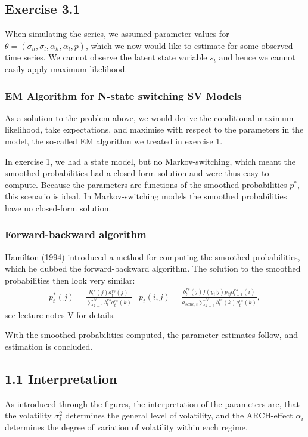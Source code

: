\documentclass[11pt,a4paper,oneside]{article}
\newcommand{\lp}{\left(}
\newcommand{\rp}{\right)}
\begin{document}
\subsection{Exercise 3.1}
When simulating the series, we assumed parameter values for $\theta = \lp \sigma_h, \sigma_l, \alpha_h, \alpha_l, p\rp$, which we now would like to estimate for some observed time series. We cannot observe the latent state variable $s_t$ and hence we cannot easily apply maximum likelihood.

\subsubsection{EM Algorithm for N-state switching SV Models}
As a solution to the problem above, we would derive the conditional maximum likelihood, take expectations, and maximise with respect to the parameters in the model, the so-called EM algorithm we treated in exercise 1.

In exercise 1, we had a state model, but no Markov-switching, which meant the smoothed probabilities had a closed-form solution and were thus easy to compute. Because the parameters are functions of the smoothed probabilities $p^*$, this scenario is ideal. In Markov-switching models the smoothed probabilities have no closed-form solution.

\subsubsection{Forward-backward algorithm}
Hamilton (1994) introduced a method for computing the smoothed probabilities, which he dubbed the forward-backward algorithm. The solution to the smoothed probabilities then look very similar:
\begin{align}
    p_t^* \lp j\rp = \frac{b_t^{rs}\lp j\rp a_t^{rs} \lp j\rp }{\sum_{k=1}^N b_t^{rs} a_t^{rs}\lp k\rp} & p_t\lp i, j\rp = \frac{b_t^{rs}\lp j\rp f\lp y_t\vert j\rp p_{ij} a_{t-1}^{rs} \lp i\rp }{a_{scale,t}\sum_{k=1}^N b_t^{rs} \lp k\rp a_t^{rs} \lp k\rp},
\end{align}
see lecture notes V for details.

With the smoothed probabilities computed, the parameter estimates follow, and estimation is concluded.

\subsection{1.1 Interpretation}
As introduced through the figures, the interpretation of the parameters are, that the volatility $\sigma_i^2$ determines the general level of volatility, and the ARCH-effect $\alpha_i$ determines the degree of variation of volatility within each regime.
\end{document}
